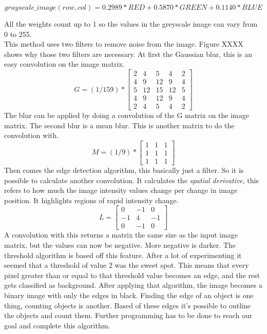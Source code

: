 \documentclass[11pt]{article}
\begin{document}
\begin{equation}
grayscale\_image(row, col) = 0.2989 * RED + 0.5870 * GREEN + 0.1140 * BLUE
\end{equation}

All the weights count up to 1 so the values in the greyscale image can vary from 0 to 255.
\\This method uses two filters to remove noise from the image. Figure XXXX shows why those two filters are necessary.
At first the Gaussian blur, this is an easy convolution on the image matrix.
\begin{equation}
  G = (1/159) * 
  \begin{bmatrix}
   2 & 4 & 5 & 4 & 2\\
   4 & 9 & 12 & 9 & 4\\
   5 & 12 & 15 & 12 & 5\\
   4 & 9 & 12 & 9& 4\\
   2 & 4 & 5 & 4 & 2
  \end{bmatrix}
\end{equation}
The blur can be applied by doing a convolution of the G matrix on the image matrix.
The second blur is a mean blur. This is another matrix to do the convolution with.
\begin{equation}
M = (1/9) * 
\begin{bmatrix}
	1&1&1\\
	1&1&1\\
	1&1&1
\end{bmatrix}
\end{equation}
Then comes the edge detection algorithm, this basically just a filter. So it is possible to calculate another convolution. It calculates the \textit{spatial  derivative}, this refers to how much the image intensity values change per change in image position. It highlights regions of rapid intensity change.
\begin{equation}
L =\begin{bmatrix}
	0&-1&0\\
	-1&4&-1\\
	0&-1&0
\end{bmatrix}
\end{equation}
A convolution with this returns a matrix the same size as the input image matrix, but the values can now be negative. More negative is darker. The threshold algorithm is based off this feature. After a lot of experimenting it seemed that a threshold of value 2 was the sweet spot. This means that every pixel greater than or equal to that threshold value becomes an edge, and the rest gets classified as background. After applying that algorithm, the image becomes a binary image with only the edges in black. Finding the edge of an object is one thing, counting objects is another. Based of these edges it's possible to outline the objects and count them. Further programming has to be done to reach our goal and complete this algorithm.
\end{document}

